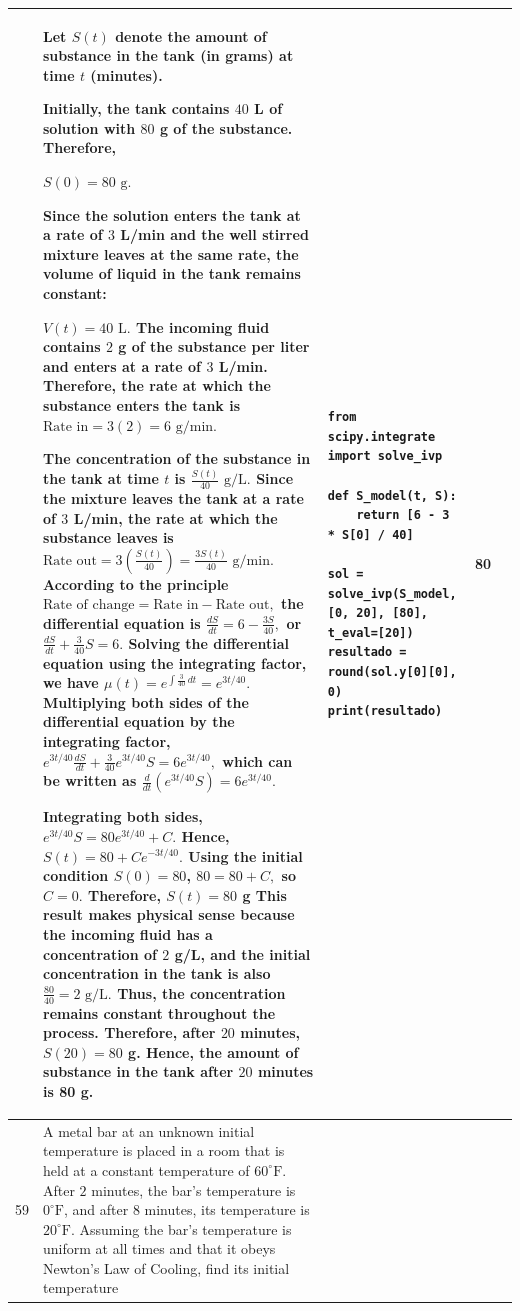 \documentclass[a4paper,12pt]{article}
\begin{document}
\begin{longtable}{|p{0.3cm}|p{}|p{10cm}|p{}|p{1.5cm}|}
              &Let $S(t)$ denote the amount of substance in the tank (in grams) at time $t$ (minutes).

Initially, the tank contains $40$ L of solution with $80$ g of the substance. Therefore,

$S(0)=80\text{ g}.$

Since the solution enters the tank at a rate of $3$ L/min and the well stirred mixture leaves at the same rate, the volume of liquid in the tank remains constant:

$V(t)=40\text{ L}.$
The incoming fluid contains $2$ g of the substance per liter and enters at a rate of $3$ L/min. Therefore, the rate at which the substance enters the tank is $\text{Rate in}=3(2)=6\text{ g/min}.$

The concentration of the substance in the tank at time $t$ is $\frac{S(t)}{40}\text{ g/L}.$
Since the mixture leaves the tank at a rate of $3$ L/min, the rate at which the substance leaves is
$\text{Rate out}=3\left(\frac{S(t)}{40}\right)
=\frac{3S(t)}{40}\text{ g/min}.$
According to the principle
$\text{Rate of change}=\text{Rate in}-\text{Rate out},$ the differential equation is
$\frac{dS}{dt}=6-\frac{3S}{40},$
or $\frac{dS}{dt}+\frac{3}{40}S=6.$
Solving the differential equation using the integrating factor, we have
$\mu(t)=e^{\int\frac{3}{40}\,dt}
=e^{3t/40}.$
Multiplying both sides of the differential equation by the integrating factor,
$e^{3t/40}\frac{dS}{dt}
+\frac{3}{40}e^{3t/40}S
=6e^{3t/40},$
which can be written as
$\frac{d}{dt}\left(e^{3t/40}S\right)
=6e^{3t/40}.$

Integrating both sides, $e^{3t/40}S =80e^{3t/40}+C.$
Hence, $S(t)=80+Ce^{-3t/40}.$
Using the initial condition $S(0)=80$, $80=80+C,$
so $C=0.$
Therefore, $S(t)=80$ g
This result makes physical sense because the incoming fluid has a concentration of $2$ g/L, and the initial concentration in the tank is also
$\frac{80}{40}=2\text{ g/L}.$
Thus, the concentration remains constant throughout the process. Therefore, after $20$ minutes, $S(20)=80$ g.
Hence, the amount of substance in the tank after $20$ minutes is 80  g.

 &\begin{verbatim}
from scipy.integrate import solve_ivp

def S_model(t, S):
    return [6 - 3 * S[0] / 40]

sol = solve_ivp(S_model, [0, 20], [80], t_eval=[20])
resultado = round(sol.y[0][0], 0)
print(resultado)
\end{verbatim}&  80\\ \hline 
 59           &  A metal bar at an unknown initial temperature is placed in a room that is held at a constant temperature of \(60^\circ\mathrm{F}\). 
After \(2\) minutes, the bar's temperature is \(0^\circ\mathrm{F}\), and after \(8\) minutes, its temperature is \(20^\circ\mathrm{F}\).
Assuming the bar's temperature is uniform at all times and that it obeys Newton's Law of Cooling, find its initial temperature



\end{longtable}
\end{document}
